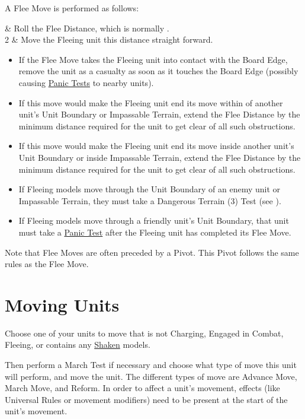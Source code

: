 A Flee Move is performed as follows:

 & Roll the Flee Distance, which is normally .\\
2 & Move the Fleeing unit this distance straight forward.\\
\closeseqtablemc

\begin{itemize}
\item If the Flee Move takes the Fleeing unit into contact with the Board Edge, remove the unit as a casualty as soon as it touches the Board Edge (possibly causing \hyperref[panic_test]{Panic Tests} to nearby units).
\item If this move would make the Fleeing unit end its move within  of another unit's Unit Boundary or Impassable Terrain, extend the Flee Distance by the minimum distance required for the unit to get clear of all such obstructions.
\item If this move would make the Fleeing unit end its move inside another unit's Unit Boundary or inside Impassable Terrain, extend the Flee Distance by the minimum distance required for the unit to get clear of all such obstructions.
\item If Fleeing models move through the Unit Boundary of an enemy unit or Impassable Terrain, they must take a Dangerous Terrain (3) Test (see ).
\item If Fleeing models move through a friendly unit's Unit Boundary, that unit must take a \hyperref[panic_test]{Panic Test} after the Fleeing unit has completed its Flee Move.
\end{itemize}

Note that Flee Moves are often preceded by a Pivot. This Pivot follows the same rules as the Flee Move.

\section{Moving Units}
\label{moving_units}

Choose one of your units to move that is not Charging, Engaged in Combat, Fleeing, or contains any \hyperref[shaken]{Shaken} models.

Then perform a March Test if necessary and choose what type of move this unit will perform, and move the unit. The different types of move are Advance Move, March Move, and Reform. In order to affect a unit's movement, effects (like Universal Rules or movement modifiers) need to be present at the start of the unit's movement.

